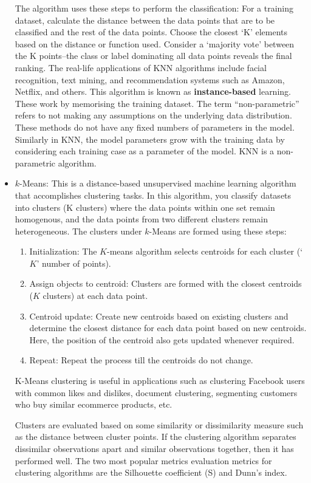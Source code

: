 \documentclass[11pt]{article}
\begin{document}
\begin{itemize}
The algorithm uses these steps to perform the classification:
For a training dataset, calculate the distance between the data points that are to be classified and the rest of the data points.
Choose the closest ‘K’ elements based on the distance or function used.
Consider a ‘majority vote’ between the K points–the class or label dominating all data points reveals the final ranking. 
The real-life applications of KNN algorithms include facial recognition, text mining, and recommendation systems such as Amazon, Netflix, and others.
This algorithm is known as \textbf{instance-based} learning. These work by memorising the training dataset. 
The term “non-parametric” refers to not making any assumptions on the underlying data distribution. These methods do not have any fixed numbers of parameters in the model.
Similarly in KNN, the model parameters grow with the training data by considering each training case as a parameter of the model. KNN is a non-parametric algorithm.

\item $k$-Means: This is a distance-based unsupervised machine learning algorithm that accomplishes clustering tasks. In this algorithm, you classify datasets into clusters (K clusters) where the data 
points within one set remain homogenous, and the data points from two different clusters remain heterogeneous. The clusters under $k$-Means are formed using these steps:
\begin{enumerate} 
\item Initialization: The $K$-means algorithm selects centroids for each cluster (‘$K$’ number of points).
\item Assign objects to centroid: Clusters are formed with the closest centroids ($K$ clusters) at each data point.
\item Centroid update: Create new centroids based on existing clusters and determine the closest distance for each data point based on new centroids. Here, the position of the centroid also gets updated whenever required.
\item Repeat: Repeat the process till the centroids do not change.
\end{enumerate} 
K-Means clustering is useful in applications such as clustering Facebook users with common likes and dislikes, document clustering, segmenting customers who buy similar ecommerce products, etc.

Clusters are evaluated based on some similarity or dissimilarity measure such as the distance between cluster points. If the clustering algorithm separates dissimilar observations apart and similar observations together, then it has performed well. The two most popular metrics evaluation metrics for clustering algorithms are the Silhouette coefficient (S) and Dunn's index. 







\end{itemize}
\end{document}
